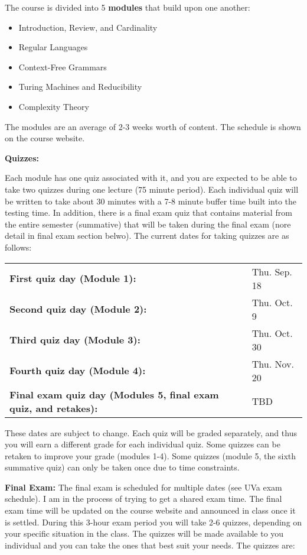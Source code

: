 \documentclass[12pt]{article}
\begin{document}
The course is divided into 5 {\bf modules} that build upon one another:
\begin{itemize}
    \item Introduction, Review, and Cardinality
    \item Regular Languages
    \item Context-Free Grammars
    \item Turing Machines and Reducibility
    \item Complexity Theory
\end{itemize}
The modules are an average of 2-3 weeks worth of content. The schedule is shown on the course website. 

\textbf{Quizzes:} 

Each module has one quiz associated with it, and you are expected to be able to take two quizzes during one lecture (75 minute period). Each individual quiz will be written to take about 30 minutes with a 7-8 minute buffer time built into the testing time. In addition, there is a final exam quiz that contains material from the entire semester (summative) that will be taken during the final exam (nore detail in final exam section belwo). The current dates for taking quizzes are as follows:

\begin{tabular}{ll}
\textbf{First quiz day (Module 1):} & Thu. Sep. 18 \\
\textbf{Second quiz day (Module 2):} & Thu. Oct. 9 \\
\textbf{Third quiz day (Module 3):} & Thu. Oct. 30 \\
\textbf{Fourth quiz day (Module 4):} & Thu. Nov. 20 \\
\textbf{Final exam quiz day (Modules 5, final exam quiz, and retakes):} & TBD \\
\end{tabular}

These dates are subject to change. Each quiz will be graded separately, and thus you will earn a different grade for each individual quiz. Some quizzes can be retaken to improve your grade (modules 1-4). Some quizzes (module 5, the sixth summative quiz) can only be taken once due to time constraints.

\textbf{Final Exam:} The final exam is scheduled for multiple dates (see UVa exam schedule). I am in the process of trying to get a shared exam time. The final exam time will be updated on the course website and announced in class once it is settled. During this 3-hour exam period you will take 2-6 quizzes, depending on your specific situation in the class. The quizzes will be made available to you individual and you can take the ones that best suit your needs. The quizzes are:
\end{document}
